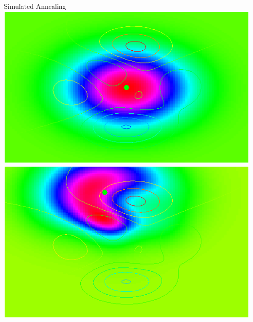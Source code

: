 \documentclass{beamer}
\begin{document}
\begin{frame}[fragile]{Simulated Annealing}
\setlength{\fboxrule}{3pt} 
\includegraphics[scale=0.5,bb=0 10 300 190]{anneal0.png}\\
\includegraphics[scale=0.5,bb=0 0 300 190]{anneal1.png}

\end{frame}
\end{document}

